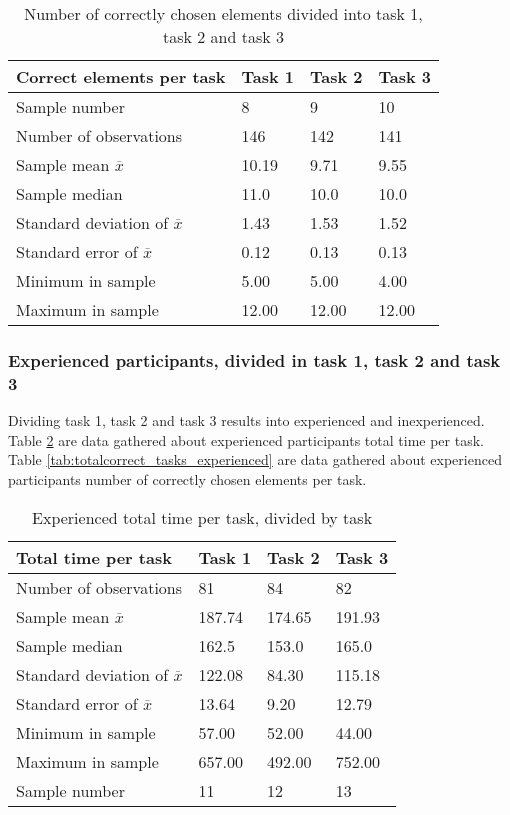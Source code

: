 \begin{table}[H]
	\centering
	\begin{tabular}{l|l|l|l}
		Correct elements per task & Task 1 & Task 2 & Task 3\\ \hline
		Sample number & 8  & 9  & 10   \\
		Number of observations & 146    & 142     & 141        \\
		Sample mean $\overline{x}$ & 10.19  &  9.71  &   9.55   \\
		Sample median & 11.0 &  10.0  &  10.0   \\
		Standard deviation of $\overline{x}$ & 1.43  & 1.53 & 1.52    \\
		Standard error of $\overline{x}$ & 0.12 &  0.13 & 0.13  \\
		Minimum in sample  & 5.00  & 5.00  &   4.00  \\
		Maximum in sample  & 12.00 & 12.00  & 12.00 \\ \hline
	\end{tabular}
	\caption[Correct elements, divided into task 1, task 2 and task 3]{Number of correctly chosen elements divided into task 1, task 2 and task 3}
	\label{tab:totalcorrect_tasks}
\end{table}

\subsubsection{Experienced participants, divided in task 1, task 2 and task 3}\label{sec:taskdivided_experienced}

Dividing task 1, task 2 and task 3 results into experienced and inexperienced. Table \ref{tab:totaltime_tasks_experienced} are data gathered about experienced participants total time per task. Table \ref{tab:totalcorrect_tasks_experienced} are data gathered about experienced participants number of correctly chosen elements per task.

\begin{table}[H]
	\centering
	\begin{tabular}{l|l|l|l}
		Total time per task & Task 1 & Task 2 & Task 3 \\ \hline
		Number of observations & 81    & 84      & 82   \\
		Sample mean $\overline{x}$  & 187.74  &  174.65  &  191.93   \\
		Sample median  & 162.5  &  153.0  &  165.0  \\
		Standard deviation of $\overline{x}$ & 122.08  & 84.30  & 115.18    \\
		Standard error of $\overline{x}$ & 13.64  & 9.20 & 12.79   \\
		Minimum in sample   & 57.00  & 52.00 &  44.00  \\
		Maximum in sample  & 657.00 & 492.00  & 752.00 \\ \hline
		Sample number & 11  & 12  & 13   \\ \hline
	\end{tabular}
	\caption[Total time, task and experienved divided]{Experienced total time per task, divided by task}
	\label{tab:totaltime_tasks_experienced}
\end{table}

